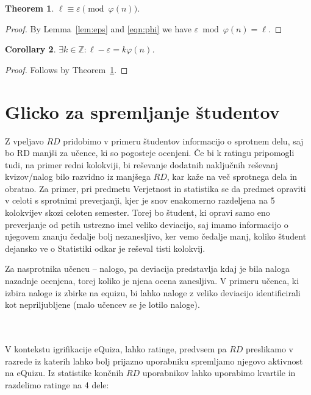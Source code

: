 \documentclass{IEEEtran}
\newcommand{\Z}{\ensuremath{\mathbb Z}}
\newtheorem{theorem}{Theorem}[section]
\newtheorem{corollary}[theorem]{Corollary}
\begin{document}
\begin{theorem} \label{thm:equiv}
$\ell \equiv \varepsilon \pmod{\varphi(n)}$.
\end{theorem}

\begin{proof}
By Lemma~\ref{lem:eps} and \eqref{eqn:phi} we have $\varepsilon \bmod{\varphi(n)} = \ell$.
\end{proof}

\begin{corollary} \label{cor:mult}
$\exists k \in \Z: \ell - \varepsilon = k \varphi(n)$.
\end{corollary}

\begin{proof}
Follows by Theorem~\ref{thm:equiv}.
\end{proof}
\fi

\section{Glicko za spremljanje študentov}
Z vpeljavo $RD$ pridobimo v primeru študentov informacijo o sprotnem delu, saj bo RD manjši za učence, ki so pogosteje ocenjeni. Če bi k ratingu pripomogli tudi, na primer redni kolokviji, bi reševanje dodatnih  naključnih reševanj kvizov/nalog bilo razvidno iz manjšega $RD$, kar kaže na več sprotnega dela in obratno. Za primer, pri predmetu Verjetnost in statistika se da predmet opraviti v celoti s sprotnimi preverjanji, kjer je snov enakomerno razdeljena na 5 kolokvijev skozi celoten semester. Torej bo študent, ki opravi samo eno preverjanje od petih ustrezno imel veliko deviacijo, saj imamo informacijo o njegovem znanju čedalje bolj nezanesljivo, ker vemo čedalje manj, koliko študent dejansko ve o Statistiki odkar je reševal tisti kolokvij.

Za nasprotnika učencu – nalogo, pa deviacija predstavlja kdaj je bila naloga nazadnje ocenjena, torej koliko je njena ocena zanesljiva. V primeru učenca, ki izbira naloge iz zbirke na equizu, bi lahko naloge z veliko deviacijo identificirali kot nepriljubljene (malo učencev se je lotilo naloge).


\hfill
\\
\\
V kontekstu igrifikacije eQuiza, lahko ratinge, predvsem pa $RD$ preslikamo v razrede iz katerih lahko bolj prijazno uporabniku spremljamo njegovo aktivnost na eQuizu. Iz statistike končnih $RD$ uporabnikov lahko uporabimo kvartile in razdelimo ratinge na 4 dele:
\end{document}
